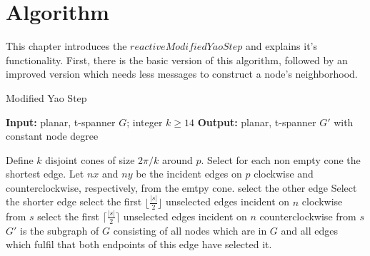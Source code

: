 \section{Algorithm}
This chapter introduces the $reactive Modified Yao Step $ and explains it's functionality.
First, there is the basic version of this algorithm, followed by an improved version which needs less messages to construct a node's neighborhood.
 
\algrenewcommand\algorithmicprocedure{\textbf{}}
\begin{algorithm}\small
\caption{Modified Yao Step}\label{MYS}
\begin{algorithmic}[0]

\Statex \textbf{Input:} planar, t-spanner $G $; integer $k\geq 14 $
\Statex \textbf{Output:} planar, t-spanner $G' $ with constant node degree

\Statex

	\State Define $k $ disjoint cones of size $2\pi/k $ around $p $.
	\State Select for each non empty cone the shortest edge.
			\State Let $nx $ and $ny $ be the incident edges on $p $ clockwise and \State counterclockwise, respectively, from the emtpy cone.
				\State select the other edge
				\Else
				\State Select the shorter edge
			\EndIf 
		\Else
			\State select the first $\lfloor \frac{|s|}{2} \rfloor $ unselected edges incident on $n $ clockwise from $s $
			\State select the first $\lceil \frac{|s|}{2} \rceil $ unselected edges incident on $n $ counterclockwise from $s $
		\EndIf
	\EndFor
\EndFor
\State $ G' $ is the subgraph of $G $ consisting of all nodes which are in $G $ and all edges which fulfil that both endpoints of this edge have selected it. 
\end{algorithmic}
\end{algorithm}





